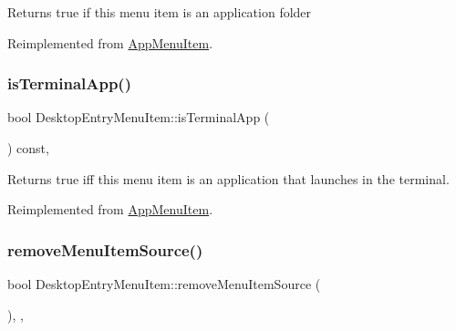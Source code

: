 \begin{DoxyReturn}{Returns}
true if this menu item is an application folder 
\end{DoxyReturn}


Reimplemented from \mbox{\hyperlink{classAppMenuItem_a8246d80e6cec284fa67a69eb8fa12354}{App\+Menu\+Item}}.

\mbox{\label{classDesktopEntryMenuItem_a6018762c850c13febc94792c81dd7e33}} 
\subsubsection{\texorpdfstring{is\+Terminal\+App()}{isTerminalApp()}}
{\footnotesize\ttfamily bool Desktop\+Entry\+Menu\+Item\+::is\+Terminal\+App (\begin{DoxyParamCaption}{ }\end{DoxyParamCaption}) const\hspace{0.3cm}{\ttfamily [override]}, {\ttfamily [virtual]}}

\begin{DoxyReturn}{Returns}
true iff this menu item is an application that launches in the terminal. 
\end{DoxyReturn}


Reimplemented from \mbox{\hyperlink{classAppMenuItem_ac8e0c435f1e5dcf67dff223d819f6a2d}{App\+Menu\+Item}}.

\mbox{\label{classDesktopEntryMenuItem_a299ebe632156d897ccbde21519ed72e4}} 
\subsubsection{\texorpdfstring{remove\+Menu\+Item\+Source()}{removeMenuItemSource()}}
{\footnotesize\ttfamily bool Desktop\+Entry\+Menu\+Item\+::remove\+Menu\+Item\+Source (\begin{DoxyParamCaption}{ }\end{DoxyParamCaption})\hspace{0.3cm}{\ttfamily [override]}, {\ttfamily [protected]}, {\ttfamily [virtual]}}

